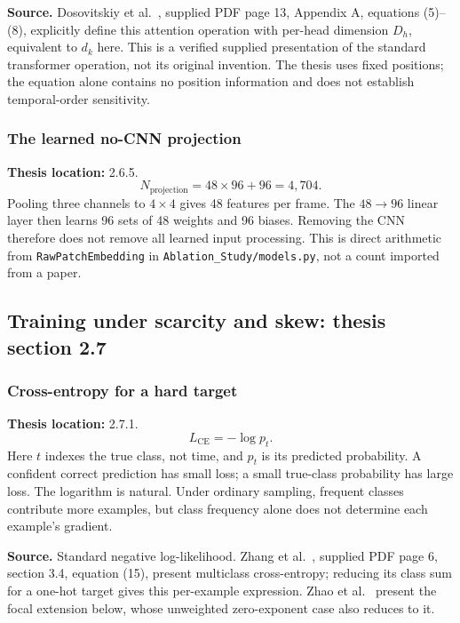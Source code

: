 \documentclass[11pt,a4paper]{article}
\numberwithin{equation}{section}
\begin{document}
\textbf{Source.} Dosovitskiy et al.~\cite{dosovitskiy2021}, supplied PDF
page 13, Appendix A, equations (5)--(8), explicitly define this attention
operation with per-head dimension $D_h$, equivalent to $d_k$ here. This is a
verified supplied presentation of the standard transformer operation, not
its original invention. The thesis uses fixed positions; the equation alone
contains no position information and does not establish temporal-order sensitivity.

\subsubsection{The learned no-CNN projection}
\label{fg:projection}
\textbf{Thesis location:} 2.6.5.
\begin{equation}
    N_{\mathrm{projection}}=48\times96+96=4{,}704.
    \label{fg:eq:projection}
\end{equation}
Pooling three channels to $4\times4$ gives 48 features per frame. The
$48\rightarrow96$ linear layer then learns 96 sets of 48 weights and 96
biases. Removing the CNN therefore does not remove all learned input
processing. This is direct arithmetic from \texttt{RawPatchEmbedding} in
\texttt{Ablation\_Study/models.py}, not a count imported from a paper.

\subsection{Training under scarcity and skew: thesis section 2.7}

\subsubsection{Cross-entropy for a hard target}
\label{fg:ce}
\textbf{Thesis location:} 2.7.1.
\begin{equation}
    L_{\mathrm{CE}}=-\log p_t.
    \label{fg:eq:ce}
\end{equation}
Here $t$ indexes the true class, not time, and $p_t$ is its predicted
probability. A confident correct prediction has small loss; a small true-class
probability has large loss. The logarithm is natural. Under ordinary sampling,
frequent classes contribute more examples, but class frequency alone does not
determine each example's gradient.

\textbf{Source.} Standard negative log-likelihood. Zhang
et al.~\cite{zhang2022}, supplied PDF page 6, section 3.4, equation (15),
present multiclass cross-entropy; reducing its class sum for a one-hot target
gives this per-example expression. Zhao et al.~\cite{zhaoS2021} present the
focal extension below, whose unweighted zero-exponent case also reduces to it.
\end{document}
